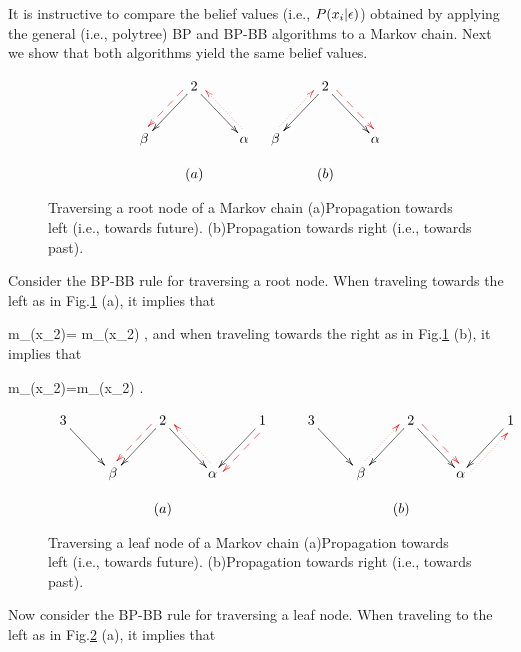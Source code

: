 It is instructive to 
compare the belief values (i.e., $P(x_i|\epsilon)$)
obtained by
 applying the 
general (i.e., polytree)  BP  
and  BP-BB algorithms  to a Markov chain.
Next we show that both algorithms 
yield the same belief values.

\begin{figure}[h!]
$$
\begin{array}{cc}
\xymatrix{
&2\ar[dr]\ar[dl]\ar@[red]@{-->}@<-1ex>[dl]
\\
\beta
&&\alp\ar@[red]@{.>}@<-1ex>[ul]
}
&
\xymatrix{
&2\ar[dr]\ar[dl]\ar@[red]@{-->}@<1ex>[dr]
\\
\beta\ar@[red]@{.>}@<1ex>[ur]
&&\alp
}
\\
\\
(a)&(b)
\end{array}
$$
\caption{Traversing a root node of a Markov chain
(a)Propagation towards left (i.e., towards future).
(b)Propagation towards right (i.e., towards past).}
\label{fig-mp-markov-trans-root}
\end{figure}

Consider
the BP-BB rule for traversing a root node. 
When traveling
towards the left
as in Fig.\ref{fig-mp-markov-trans-root} (a), 
it implies that

\beq
m_{\alp {}}(x_2)= m_{\beta {}}(x_2)
\;,
\eeq
and
when traveling
towards the right
as in Fig.\ref{fig-mp-markov-trans-root} (b), 
it implies that

\beq
m_{\beta{}}(x_2)=m_{\alp{}}(x_2)
\;.
\eeq



\begin{figure}[h!]
$$
\begin{array}{cc}
\xymatrix{
3\ar[dr]
&&
2\ar[rd]\ar[dl]\ar@[red]@{-->}@<-1ex>[dl]
&&
1\ar[ld]\ar@[red]@{-->}@<1ex>[dl]
\\
&\beta
&&\alp\ar@[red]@{.>}@<-1ex>[ul]
}
&
\;\;\;\;\;
\xymatrix{
3\ar[dr]
&&
2\ar[rd]\ar[dl]\ar@[red]@{-->}@<1ex>[dr]
&&
1\ar[ld]
\\
&\beta\ar@[red]@{.>}@<1ex>[ur]
&&\alp\ar@[red]@{.>}@<-1ex>[ur]
}
\\
\\
(a)&(b)
\end{array}
$$
\caption{Traversing a leaf node of a Markov chain
(a)Propagation towards left (i.e., towards future).
(b)Propagation towards right (i.e., towards past).}
\label{fig-mp-markov-trans-leaf}
\end{figure}

Now consider the BP-BB rule for traversing a leaf node.
When
traveling to the left as
in Fig.\ref{fig-mp-markov-trans-leaf} (a),
it implies that

